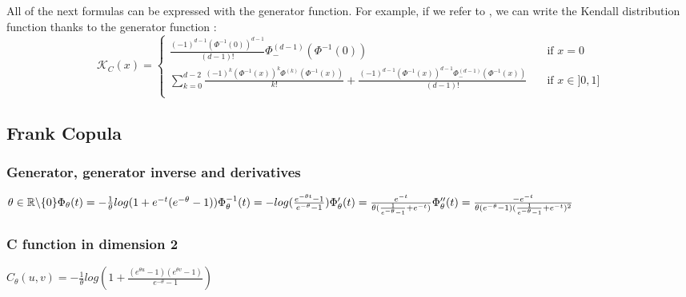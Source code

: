 \documentclass{article}
\begin{document}
	All of the next formulas can be expressed with the generator function.\newline
	For example, if we refer to \cite{archimedeancopulas}, we can write the Kendall distribution function thanks to the generator function :
	\[
   		\mathcal{K}_C (x) =
   		\begin{cases}
        \frac{(-1)^{d-1}(\Phi^{-1}(0))^{d-1}}{(d-1)!}\Phi_-^{(d-1)}(\Phi^{-1}(0))  & \quad \text{if } x=0 \\
    \sum\limits_{k=0}^{d-2}\frac{(-1)^{k}(\Phi^{-1}(x))^{k}\Phi^{(k)}(\Phi^{-1}(x))}{k!}+\frac{(-1)^{d-1}(\Phi^{-1}(x))^{d-1}\Phi_-^{(d-1)}(\Phi^{-1}(x))}{(d-1)!} & \quad \text{if } x \in ]0,1] \\
  \end{cases}
  \]
   	\subsection{Frank Copula}
   	\subsubsection{Generator, generator inverse and derivatives}
   	\begin{math}
   		\theta \in \mathbb{R} \backslash \{ 0 \} \newline
   		\newline
   		\Phi_{\theta}(t)= -\frac{1}{\theta}log(1+e^{-t}(e^{-\theta}-1))
   		\newline
   		\newline
   		\Phi_{\theta}^{-1}(t)=-log(\frac{e^{-\theta t}-1}{e^{-\theta}-1})
   		\newline
   		\newline
   		\Phi_{\theta}^\prime (t)= \frac{e^{-t}}{\theta (\frac{1}{e^{-\theta} -1}+e^{-t})}
   		\newline
   		\newline
   		\Phi_{\theta}^{\prime \prime} (t)= \frac{-e^{-t}}{\theta (e^{-\theta} -1) (\frac{1}{e^{-\theta} -1}+e^{-t})^2}
   	\end{math}


   	\subsubsection{C function in dimension 2}
   	\begin{math}
   		C_{\theta}(u,v) = -\frac{1}{\theta}log(1+\frac{(e^{\theta u}-1)(e^{\theta v}-1)}{e^{-\theta}-1})
   	\end{math}
\end{document}
